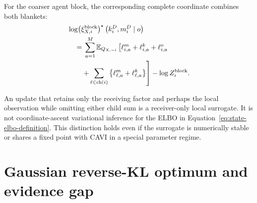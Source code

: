 For the coarser agent block, the corresponding complete coordinate combines both blankets:
\begin{align}
&\log \bigl(\xi^{\mathrm{block}}_{X,i}\bigr)^\star
\left(k_i^D,m_i^D\mid o\right)\notag\\
&\quad={}
\sum_{a=1}^{M}\mathbb E_{Q_{X,-i}}\left[
\ell_{i,a}^{m}+\ell_{i,a}^{k}+\ell_{i,a}^{o}
\right.\notag\\
&\left.\qquad+
\sum_{\ell\in\operatorname{ch}(i)}
\left\{
\ell_{\ell,a}^{m}+\ell_{\ell,a}^{k}
\right\}
\right]
-\log Z_i^{\mathrm{block}}.
\label{eq:complete-agent-block-cavi-coordinate}
\end{align}

An update that retains only the receiving factor and perhaps the local observation while omitting either child sum is a receiver-only local surrogate. It is not coordinate-ascent variational inference for the ELBO in Equation~\eqref{eq:state-elbo-definition}. This distinction holds even if the surrogate is numerically stable or shares a fixed point with CAVI in a special parameter regime.

\section{Gaussian reverse-KL optimum and evidence gap}

